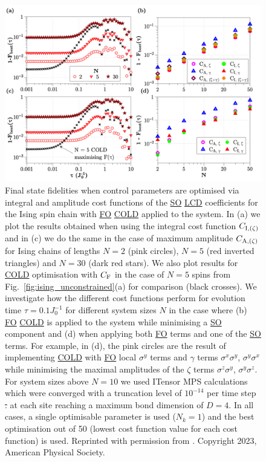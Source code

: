 \documentclass[a4paper,oneside,11pt]{book}
\newcommand{\sx}{\sigma^x}
\newcommand{\sy}{\sigma^y}
\newcommand{\sz}{\sigma^z}
\newcommand{\acrref}[1]{\hyperref[acr:#1]{#1}}
\providecommand{\DIFdeltex}[1]{{\protect\color{red}\sout{#1}}}                      %
\providecommand{\DIFdelFL}[1]{\DIFdel{#1}} %
\providecommand{\DIFdelbeginFL}{} %
\providecommand{\DIFdelendFL}{} %
\providecommand{\DIFdel}[1]{\texorpdfstring{\DIFdeltex{#1}}{}} %
\newcommand{\DIFscaledelfig}{0.5}
\newlength{\DIFdelgraphicswidth} %
\newlength{\DIFdelgraphicsheight} %
\newcommand{\DIFdelincludegraphics}[2][]{%
\sbox{\DIFdelgraphicsbox}{\DIFOincludegraphics[#1]{#2}}%
\settoboxwidth{\DIFdelgraphicswidth}{\DIFdelgraphicsbox} %
\settoboxtotalheight{\DIFdelgraphicsheight}{\DIFdelgraphicsbox} %
\scalebox{\DIFscaledelfig}{%
\parbox[b]{\DIFdelgraphicswidth}{\usebox{\DIFdelgraphicsbox}\\[-\baselineskip] \rule{\DIFdelgraphicswidth}{0em}}\llap{\resizebox{\DIFdelgraphicswidth}{\DIFdelgraphicsheight}{%
\setlength{\unitlength}{\DIFdelgraphicswidth}%
\begin{picture}(1,1)%
\thicklines\linethickness{2pt} %
{\color[rgb]{1,0,0}\put(0,0){\framebox(1,1){}}}%
{\color[rgb]{1,0,0}\put(0,0){\line( 1,1){1}}}%
{\color[rgb]{1,0,0}\put(0,1){\line(1,-1){1}}}%
\end{picture}%
}\hspace*{3pt}}} %
} %
\DeclareRobustCommand{\DIFdelbeginFL}{\DIFOdelbeginFL \let\includegraphics\DIFdelincludegraphics} %
\DeclareRobustCommand{\DIFdelendFL}{\DIFOaddendFL \let\includegraphics\DIFOincludegraphics} %
\begin{document}
\begin{figure}[t!]
    \centering
    \includegraphics[width=\linewidth]{images/ising_max_int_plots.png} \caption[Plot of final state fidelity for the Ising spin chain for different cost functions with LCD applied.]{Final state fidelities when control parameters are optimised via integral and amplitude cost functions of the \acrref{SO} \acrref{LCD} coefficients for the Ising spin chain with \acrref{FO} \acrref{COLD} applied to the system. In (a) we plot the results obtained when using the integral cost function $C_{\rm I, (\zeta)}$ and in (c) we do the same in the case of maximum amplitude $C_{\rm A, (\zeta)}$ for Ising chains of lengths $N = 2$ (pink circles), $N = 5$ (red inverted triangles) and $N=30$ (dark red stars). We also plot results for \acrref{COLD} optimisation with $C_{\rm F}$ in the case of $N=5$ spins from Fig.~\ref{fig:ising_unconstrained}(a) for comparison (black crosses). We investigate how the different cost functions perform for evolution time $\tau = 0.1J_0^{-1}$ for different system sizes $N$ in the case where (b) \acrref{FO} \acrref{COLD} is applied to the system while minimising a \acrref{SO} component and (d) when applying both \acrref{FO} terms and one of the \acrref{SO} terms. For example, in (d), the pink circles are the result of implementing \acrref{COLD} with \acrref{FO} local $\sy$ terms and $\gamma$ terms $\sx\sy$, $\sy\sx$ while minimising the maximal amplitudes of the $\zeta$ terms $\sz\sy$, $\sy\sz$. For system sizes above $N=10$ we used ITensor\cite{fishman_itensor_2022} MPS calculations which were converged with a truncation level of $10^{-14}$ per time step \DIFdelbeginFL \DIFdelFL{. }\DIFdelendFL at each site reaching a maximum bond dimension of $D = 4$. In all cases, a single optimisable parameter is used ($N_k = 1$) and the best optimisation out of 50 (lowest cost function value for each cost function) is used. Reprinted with permission from \cite{cepaite_counterdiabatic_2023}. Copyright 2023, American Physical Society.}\label{fig:ising_minimising_ho_mainplot}
\end{figure}
\end{document}
